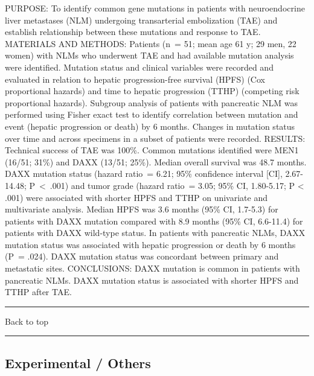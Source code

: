 \documentclass[]{article}
\begin{document}
PURPOSE: To identify common gene mutations in patients with
neuroendocrine liver metastases (NLM) undergoing transarterial
embolization (TAE) and establish relationship between these mutations
and response to TAE. MATERIALS AND METHODS: Patients (n~= 51; mean age
61 y; 29 men, 22 women) with NLMs who underwent TAE and had available
mutation analysis were identified. Mutation status and clinical
variables were recorded and evaluated in relation to hepatic
progression-free survival (HPFS) (Cox proportional hazards) and time to
hepatic progression (TTHP) (competing risk proportional hazards).
Subgroup analysis of patients with pancreatic NLM was performed using
Fisher exact test to identify correlation between mutation and event
(hepatic progression or death) by 6 months. Changes in mutation status
over time and across specimens in a subset of patients were recorded.
RESULTS: Technical success of TAE was 100\%. Common mutations identified
were MEN1 (16/51; 31\%) and DAXX (13/51; 25\%). Median overall survival
was 48.7 months. DAXX mutation status (hazard ratio~= 6.21; 95\%
confidence interval {[}CI{]}, 2.67-14.48; P~\textless{}~.001) and tumor
grade (hazard ratio~= 3.05; 95\% CI, 1.80-5.17; P \textless{} .001) were
associated with shorter HPFS and TTHP on univariate and multivariate
analysis. Median HPFS was 3.6 months (95\% CI, 1.7-5.3) for patients
with DAXX mutation compared with 8.9 months (95\% CI, 6.6-11.4) for
patients with DAXX wild-type status. In patients with pancreatic NLMs,
DAXX mutation status was associated with hepatic progression or death by
6 months (P~= .024). DAXX mutation status was concordant between primary
and metastatic sites. CONCLUSIONS: DAXX mutation is common in patients
with pancreatic NLMs. DAXX mutation status is associated with shorter
HPFS and TTHP after TAE.

{}

{}

\begin{center}\rule{0.5\linewidth}{\linethickness}\end{center}

Back to top

\begin{center}\rule{0.5\linewidth}{\linethickness}\end{center}

\pagebreak

\hypertarget{experimental-others}{%
\subsection{Experimental / Others}\label{experimental-others}}
\end{document}
